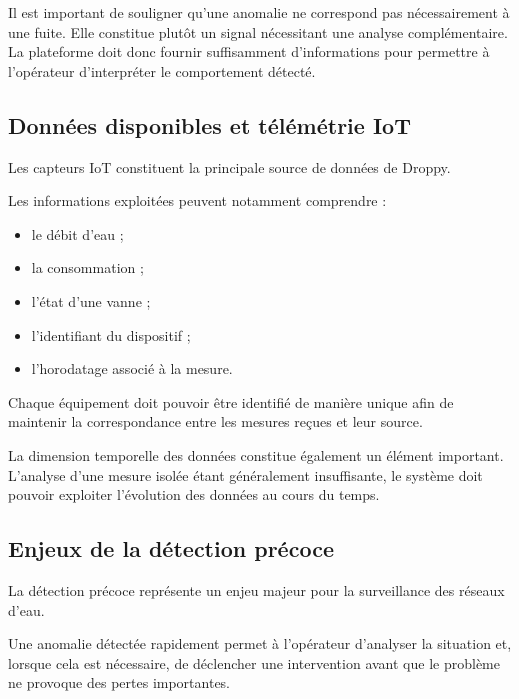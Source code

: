 Il est important de souligner qu'une anomalie ne correspond pas
nécessairement à une fuite. Elle constitue plutôt un signal nécessitant
une analyse complémentaire. La plateforme doit donc fournir suffisamment
d'informations pour permettre à l'opérateur d'interpréter le comportement
détecté.

\subsection{Données disponibles et télémétrie IoT}

Les capteurs IoT constituent la principale source de données de Droppy.

Les informations exploitées peuvent notamment comprendre :

\begin{itemize}

    \item le débit d'eau ;

    \item la consommation ;

    \item l'état d'une vanne ;

    \item l'identifiant du dispositif ;

    \item l'horodatage associé à la mesure.

\end{itemize}

Chaque équipement doit pouvoir être identifié de manière unique afin de
maintenir la correspondance entre les mesures reçues et leur source.

La dimension temporelle des données constitue également un élément
important. L'analyse d'une mesure isolée étant généralement insuffisante,
le système doit pouvoir exploiter l'évolution des données au cours du
temps.

\subsection{Enjeux de la détection précoce}

La détection précoce représente un enjeu majeur pour la surveillance des
réseaux d'eau.

Une anomalie détectée rapidement permet à l'opérateur d'analyser la
situation et, lorsque cela est nécessaire, de déclencher une intervention
avant que le problème ne provoque des pertes importantes.


